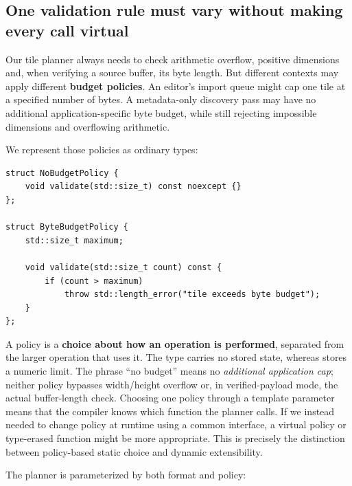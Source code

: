 \subsection{One validation rule must vary without making every call virtual}\label{05-engine-i-ch005-one-validation-rule-must-vary-without-making-every-call-virtual}

\hypertarget{05-engine-i-ch005-one-validation-rule-must-vary-without-making-every-call-virtual}{}

Our tile planner always needs to check arithmetic overflow, positive dimensions and, when verifying a source buffer, its byte length. But different contexts may apply different \textbf{budget policies}. An editor's import queue might cap one tile at a specified number of bytes. A metadata-only discovery pass may have no additional application-specific byte budget, while still rejecting impossible dimensions and overflowing arithmetic.

We represent those policies as ordinary types:

\begin{verbatim}
struct NoBudgetPolicy {
    void validate(std::size_t) const noexcept {}
};

struct ByteBudgetPolicy {
    std::size_t maximum;

    void validate(std::size_t count) const {
        if (count > maximum)
            throw std::length_error("tile exceeds byte budget");
    }
};
\end{verbatim}

A policy is a \textbf{choice about how an operation is performed}, separated from the larger operation that uses it. The type  carries no stored state, whereas  stores a numeric limit. The phrase ``no budget'' means no \emph{additional application cap}; neither policy bypasses width/height overflow or, in verified-payload mode, the actual buffer-length check. Choosing one policy through a template parameter means that the compiler knows which  function the planner calls. If we instead needed to change policy at runtime using a common interface, a virtual policy or type-erased function might be more appropriate. This is precisely the distinction between policy-based static choice and dynamic extensibility.

The planner is parameterized by both format and policy:

